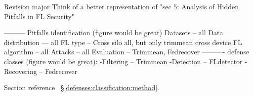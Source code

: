 Revision major
Think of a better representation of "sec 5: Analysis of Hidden Pitfalls in FL Security"


---------
Pitfalls identification  (figure would be great)
Datasets -- all
Data distribution --- all
FL type -- Cross silo all, but only trimmean cross device
FL algorithm -- all
Attacks -- all
Evaluation -- Trimmean, Fedrecover
----------
defense classes (figure would be great):
-Filtering -- Trimmean
-Detection -- FLdetector
-Recovering -- Fedrecover

Section reference ~\S\ref{defenses:classification:method}.